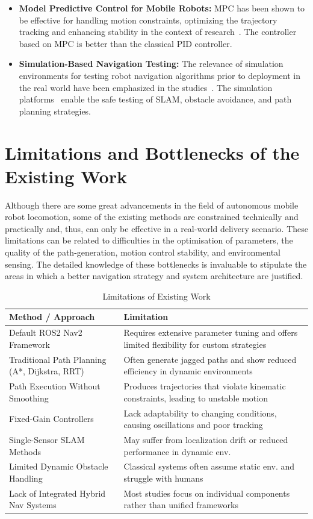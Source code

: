 \begin{itemize}
\item \textbf{Model Predictive Control for Mobile Robots:} MPC has been shown to be effective for handling motion constraints, optimizing the trajectory tracking and enhancing stability in the context of research~\cite{nascimento2023nonlinear}. The controller based on MPC is better than the classical PID controller.

\item \textbf{Simulation-Based Navigation Testing:} The relevance of simulation environments for testing robot navigation algorithms prior to deployment in the real world have been emphasized in the studies~\cite{park2021simulation}. The simulation platforms~\cite{koenig2004gazebo} enable the safe testing of SLAM, obstacle avoidance, and path planning strategies.
\end{itemize}

\section{Limitations and Bottlenecks of the Existing Work}
Although there are some great advancements in the field of autonomous mobile robot locomotion, some of the existing methods are constrained technically and practically and, thus, can only be effective in a real-world delivery scenario. These limitations can be related to difficulties in the optimisation of parameters, the quality of the path-generation, motion control stability, and environmental sensing. The detailed knowledge of these bottlenecks is invaluable to stipulate the areas in which a better navigation strategy and system architecture are justified.
\begin{table}[htbp]
\centering
\caption{Limitations of Existing Work}
\label{tab:limitations}
\begin{tabular}{|p{5cm}|p{9cm}|}
\hline
\textbf{Method / Approach} & \textbf{Limitation} \\
\hline
Default ROS2 Nav2 Framework & Requires extensive parameter tuning and offers limited flexibility for custom strategies \\
\hline
Traditional Path Planning (A*, Dijkstra, RRT) & Often generate jagged paths and show reduced efficiency in dynamic environments \\
\hline
Path Execution Without Smoothing & Produces trajectories that violate kinematic constraints, leading to unstable motion \\
\hline
Fixed-Gain Controllers & Lack adaptability to changing conditions, causing oscillations and poor tracking \\
\hline
Single-Sensor SLAM Methods & May suffer from localization drift or reduced performance in dynamic env. \\
\hline
Limited Dynamic Obstacle Handling & Classical systems often assume static env. and struggle with humans \\
\hline
Lack of Integrated Hybrid Nav Systems & Most studies focus on individual components rather than unified frameworks \\
\hline
\end{tabular}
\end{table}

